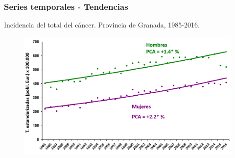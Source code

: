 \documentclass{beamer}
\begin{document}
\begin{frame}\frametitle{Series temporales - Tendencias}
	
	\centering
	Incidencia del total del cáncer. Provincia de Granada, 1985-2016.
	\begin{figure}
		\centering
		\includegraphics[width=\textwidth]{images/tendencias1.png}
	\end{figure}
	
\end{frame}
\end{document}
